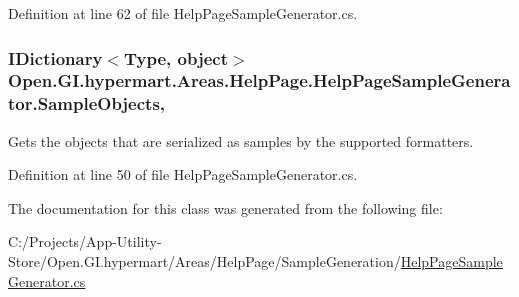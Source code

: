 Definition at line 62 of file Help\+Page\+Sample\+Generator.\+cs.

\hypertarget{class_open_1_1_g_i_1_1hypermart_1_1_areas_1_1_help_page_1_1_help_page_sample_generator_a1a16afd9020493bb00d793ed79d0a056}{}
\subsubsection[{Sample\+Objects}]{\setlength{\rightskip}{0pt plus 5cm}I\+Dictionary$<$Type, object$>$ Open.\+G\+I.\+hypermart.\+Areas.\+Help\+Page.\+Help\+Page\+Sample\+Generator.\+Sample\+Objects\hspace{0.3cm}{\ttfamily [get]}, {\ttfamily [set]}}\label{class_open_1_1_g_i_1_1hypermart_1_1_areas_1_1_help_page_1_1_help_page_sample_generator_a1a16afd9020493bb00d793ed79d0a056}


Gets the objects that are serialized as samples by the supported formatters. 



Definition at line 50 of file Help\+Page\+Sample\+Generator.\+cs.



The documentation for this class was generated from the following file\+:\begin{DoxyCompactItemize}
\item 
C\+:/\+Projects/\+App-\/\+Utility-\/\+Store/\+Open.\+G\+I.\+hypermart/\+Areas/\+Help\+Page/\+Sample\+Generation/\hyperlink{_help_page_sample_generator_8cs}{Help\+Page\+Sample\+Generator.\+cs}\end{DoxyCompactItemize}

